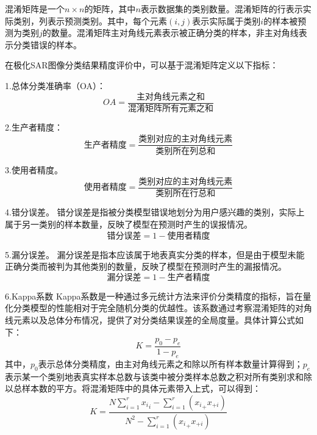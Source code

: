 混淆矩阵是一个$n \times n$的矩阵，其中$n$表示数据集的类别数量。混淆矩阵的行表示实际类别，列表示预测类别。其中，每个元素$(i, j)$表示实际属于类别$i$的样本被预测为类别$j$的数量。混淆矩阵主对角线元素表示被正确分类的样本，非主对角线表示分类错误的样本。

在极化SAR图像分类结果精度评价中，可以基于混淆矩阵定义以下指标：

1.总体分类准确率（OA）：
\begin{equation}
    OA=\frac{\mbox{主对角线元素之和}}{\mbox{混淆矩阵所有元素之和}}
\end{equation}

2.生产者精度：
\begin{equation}
    \mbox{生产者精度}=\frac{\mbox{类别对应的主对角线元素}}{\mbox{类别所在列总和}}
\end{equation}

3.使用者精度。
\begin{equation}
    \mbox{使用者精度}=\frac{\mbox{类别对应的主对角线元素}}{\mbox{类别所在行总和}}
\end{equation}

4.错分误差。
错分误差是指被分类模型错误地划分为用户感兴趣的类别，实际上属于另一类别的样本数量，反映了模型在预测时产生的误报情况。
\begin{equation}
    \mbox{错分误差}=1-\mbox{使用者精度}
\end{equation}

5.漏分误差。
漏分误差是指本应该属于地表真实分类的样本，但是由于模型未能正确分类而被判为其他类别的数量，反映了模型在预测时产生的漏报情况。
\begin{equation}
    \mbox{漏分误差}=1-\mbox{生产者精度}
\end{equation}

6.Kappa系数
Kappa系数是一种通过多元统计方法来评价分类精度的指标，旨在量化分类模型的性能相对于完全随机分类的优越性。该系数通过考察混淆矩阵的对角线元素以及总体分布情况，提供了对分类结果误差的全局度量。具体计算公式如下：
\begin{equation}
    K=\frac{p_0-p_e}{1-p_e}
\end{equation}
其中，$p_0$表示总体分类精度，由主对角线元素之和除以所有样本数量计算得到；$p_e$表示某一个类别地表真实样本总数与该类中被分类样本总数之积对所有类别求和除以总样本数的平方。将混淆矩阵中的具体元素带入上式，可以得到：
\begin{equation}
    K=\frac{N\sum_{i=1}^{r}{{x_i}_i}-\sum_{i=1}^{r}{\left( {x_i}_+x_{+i} \right)}}{N^2-\sum_{i=1}^{r}{\left( {x_i}_+x_{+i} \right)}}
\end{equation}

